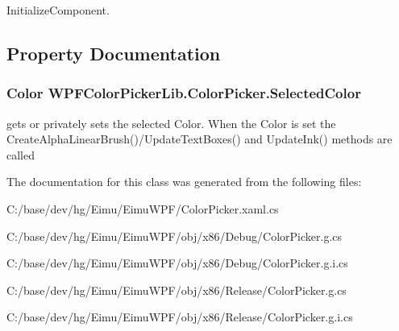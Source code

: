 InitializeComponent. 



\subsection{Property Documentation}
\hypertarget{class_w_p_f_color_picker_lib_1_1_color_picker_a0507e30a334f6bdff5b4b7533a4d1689}{
\subsubsection[{SelectedColor}]{\setlength{\rightskip}{0pt plus 5cm}Color WPFColorPickerLib.ColorPicker.SelectedColor}}
\label{class_w_p_f_color_picker_lib_1_1_color_picker_a0507e30a334f6bdff5b4b7533a4d1689}


gets or privately sets the selected Color. When the Color is set the CreateAlphaLinearBrush()/UpdateTextBoxes() and UpdateInk() methods are called 



The documentation for this class was generated from the following files:\begin{DoxyCompactItemize}
\item 
C:/base/dev/hg/Eimu/EimuWPF/ColorPicker.xaml.cs\item 
C:/base/dev/hg/Eimu/EimuWPF/obj/x86/Debug/ColorPicker.g.cs\item 
C:/base/dev/hg/Eimu/EimuWPF/obj/x86/Debug/ColorPicker.g.i.cs\item 
C:/base/dev/hg/Eimu/EimuWPF/obj/x86/Release/ColorPicker.g.cs\item 
C:/base/dev/hg/Eimu/EimuWPF/obj/x86/Release/ColorPicker.g.i.cs\end{DoxyCompactItemize}
